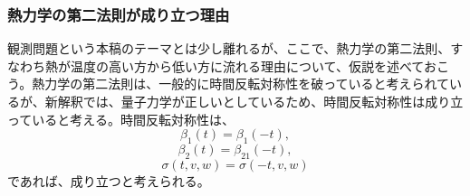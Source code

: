 \subsubsection{熱力学の第二法則が成り立つ理由}
観測問題という本稿のテーマとは少し離れるが、ここで、熱力学の第二法則、すなわち熱が温度の高い方から低い方に流れる理由について、仮説を述べておこう。熱力学の第二法則は、一般的に時間反転対称性を破っていると考えられているが、新解釈では、量子力学が正しいとしているため、時間反転対称性は成り立っていると考える。時間反転対称性は、
\begin{equation}
    \beta_1(t) = \beta_1(-t),
\end{equation}
\begin{equation}
    \beta_2(t) = \beta_21(-t),
\end{equation}
\begin{equation}
    \sigma(t,v,w) = \sigma(-t,v,w)
\end{equation}
であれば、成り立つと考えられる。
